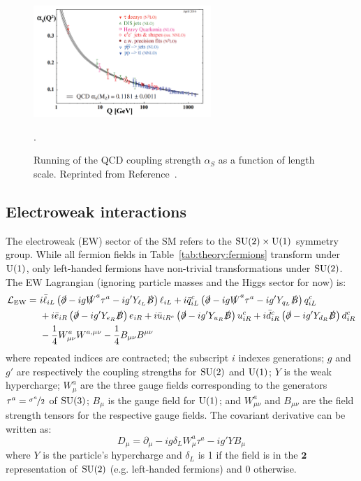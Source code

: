 \begin{figure}[]
\begin{center}
    \includegraphics[width=0.6\textwidth]{figures/theory/alphas.png}
    \caption{Running of the QCD coupling strength $\alpha_S$ as a function of length scale.
             Reprinted from Reference~\cite{pdg}.}
    \label{fig:theory:alphas}.
\end{center}
\end{figure}

\subsection{Electroweak interactions}
\label{sec:theory:ewk}
The electroweak (EW) sector of the SM refers to the $\operatorname{\mathrm{SU}}(2)\times\operatorname{\mathrm{U}}(1)$ symmetry group.
While all fermion fields in Table~\ref{tab:theory:fermions} transform under $\operatorname{\mathrm{U}}(1)$, only left-handed fermions have non-trivial transformations under $\operatorname{\mathrm{SU}}(2)$.
The EW Lagrangian (ignoring particle masses and the Higgs sector for now) is:
\begin{align}
\mathcal{L}_\mathrm{EW} =~
        & i\bar\ell_{iL} \left(\slashed\partial-ig \slashed W^a \tau^a - ig'Y_{\ell_L} \slashed B\right)\ell_{iL} 
      + i\bar q_{iL}^{c} \left(\slashed\partial-ig \slashed W^a \tau^a - ig'Y_{q_L} \slashed B\right)q_{iL}^{c} \nonumber \\
      & + i\bar e_{iR} \left(\slashed\partial-ig'Y_{ e_R}\slashed B\right) e_{iR} 
       + i\bar u_{iR^{c}} \left(\slashed\partial-ig'Y_{u_R}\slashed B\right) u_{iR}^{c} 
       + i\bar d_{iR}^{c} \left(\slashed\partial-ig'Y_{d_R}\slashed B\right) d_{iR}^{c} \nonumber \\ 
      & - \frac{1}{4} W_{\mu\nu}^a W^{a,\mu\nu} - \frac{1}{4} B_{\mu\nu} B^{\mu\nu}  
      \label{eq:theory:lew}
\end{align}
where repeated indices are contracted; the subscript $i$ indexes generations; $g$ and $g'$ are respectively the coupling strengths for $\operatorname{\mathrm{SU}}(2)$ and $\operatorname{\mathrm{U}}(1)$; $Y$ is the weak hypercharge; $W_\mu^a$ are the three gauge fields corresponding to the generators $\tau^a = \nicefrac{\sigma^a}{2}$ of $\operatorname{\mathrm{SU}}(3)$; $B_\mu$ is the gauge field for $\operatorname{\mathrm{U}}(1)$; and $W_{\mu\nu}^a$ and $B_{\mu\nu}$ are the field strength tensors for the respective gauge fields.
The covariant derivative can be written as:
\begin{equation}
    D_\mu = \partial_\mu - ig\delta_L W^a_\mu \tau^a - ig' YB_\mu
\end{equation}
where $Y$ is the particle's hypercharge and $\delta_L$ is 1 if the field is in the $\mathbf{2}$ representation of $\operatorname{\mathrm{SU}}(2)$ (e.g. left-handed fermions) and 0 otherwise. 

